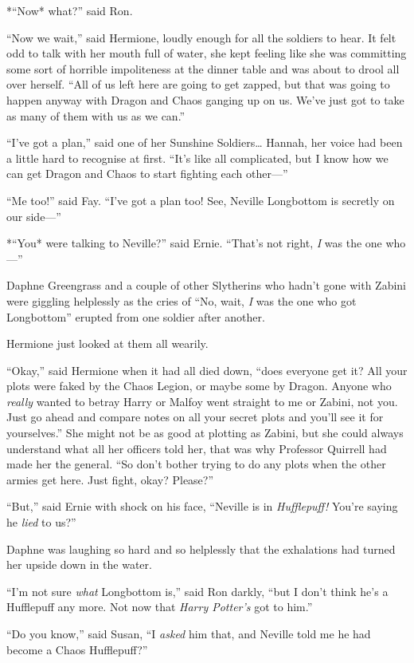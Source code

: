 *``Now* what?'' said Ron.

``Now we wait,'' said Hermione, loudly enough for all the soldiers to
hear. It felt odd to talk with her mouth full of water, she kept feeling
like she was committing some sort of horrible impoliteness at the dinner
table and was about to drool all over herself. ``All of us left here are
going to get zapped, but that was going to happen anyway with Dragon and
Chaos ganging up on us. We've just got to take as many of them with us
as we can.''

``I've got a plan,'' said one of her Sunshine Soldiers\ldots{} Hannah,
her voice had been a little hard to recognise at first. ``It's like all
complicated, but I know how we can get Dragon and Chaos to start
fighting each other---''

``Me too!'' said Fay. ``I've got a plan too! See, Neville Longbottom is
secretly on our side---''

*``You* were talking to Neville?'' said Ernie. ``That's not right,
\emph{I} was the one who---''

Daphne Greengrass and a couple of other Slytherins who hadn't gone with
Zabini were giggling helplessly as the cries of ``No, wait, \emph{I} was
the one who got Longbottom'' erupted from one soldier after another.

Hermione just looked at them all wearily.

``Okay,'' said Hermione when it had all died down, ``does everyone get
it? All your plots were faked by the Chaos Legion, or maybe some by
Dragon. Anyone who \emph{really} wanted to betray Harry or Malfoy went
straight to me or Zabini, not you. Just go ahead and compare notes on
all your secret plots and you'll see it for yourselves.'' She might not
be as good at plotting as Zabini, but she could always understand what
all her officers told her, that was why Professor Quirrell had made her
the general. ``So don't bother trying to do any plots when the other
armies get here. Just fight, okay? Please?''

``But,'' said Ernie with shock on his face, ``Neville is in
\emph{Hufflepuff!} You're saying he \emph{lied} to us?''

Daphne was laughing so hard and so helplessly that the exhalations had
turned her upside down in the water.

``I'm not sure \emph{what} Longbottom is,'' said Ron darkly, ``but I
don't think he's a Hufflepuff any more. Not now that \emph{Harry
Potter's} got to him.''

``Do you know,'' said Susan, ``I \emph{asked} him that, and Neville told
me he had become a Chaos Hufflepuff?''

